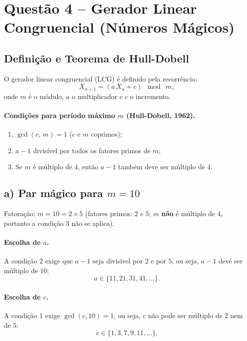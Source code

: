\documentclass[12pt,a4paper]{article}
\theoremstyle{definition}
\begin{document}
\section{Quest\~ao 4 -- Gerador Linear Congruencial (N\'umeros M\'agicos)}

\subsection{Defini\c{c}\~ao e Teorema de Hull-Dobell}

O gerador linear congruencial (LCG) \'e definido pela recorr\^encia:
\begin{equation}
  X_{n+1} = (a\,X_n + c)\;\bmod\;m,
  \label{eq:lcg}
\end{equation}
onde $m$ \'e o m\'odulo, $a$ o multiplicador e $c$ o incremento.

\paragraph{Condi\c{c}\~oes para per\'iodo m\'aximo $m$ (Hull-Dobell, 1962).}
\begin{enumerate}
  \item $\gcd(c,\,m) = 1$ \quad ($c$ e $m$ coprimos);
  \item $a - 1$ divisível por todos os fatores primos de $m$;
  \item Se $m$ é múltiplo de $4$, então $a-1$ também deve ser múltiplo de $4$.
\end{enumerate}

\subsection{a) Par m\'agico para \texorpdfstring{$m = 10$}{m = 10}}

Fatoração: $m = 10 = 2 \times 5$ (fatores primos: $2$ e $5$; $m$ \textbf{n\~ao} \'e m\'ultiplo de $4$,
portanto a condição 3 n\~ao se aplica).

\paragraph{Escolha de $a$.}
A condição 2 exige que $a - 1$ seja divis\'ivel por $2$ e por $5$,
ou seja, $a - 1$ dev\'e ser m\'ultiplo de $10$:
\begin{equation}
  a \in \{11, 21, 31, 41, \ldots\}.
\end{equation}

\paragraph{Escolha de $c$.}
A condição 1 exige $\gcd(c, 10) = 1$, ou seja, $c$ n\~ao pode ser m\'ultiplo de $2$ nem de $5$:
\begin{equation}
  c \in \{1, 3, 7, 9, 11, \ldots\}.
\end{equation}
\end{document}
